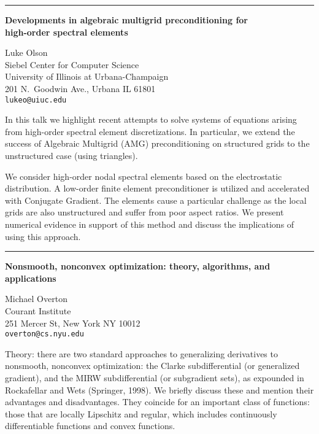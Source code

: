 \documentclass[twosided]{report}
\begin{document}
	\begin{center} \rule{6in}{1pt} \end{center}

\begin{center}
{\large			%
{\bf Developments in algebraic multigrid preconditioning for \\
	high-order spectral elements}}

	Luke Olson \\
	Siebel Center for Computer Science \\
	University of Illinois at
	Urbana-Champaign \\ 201 N.~Goodwin Ave., Urbana IL 61801 \\
	{\tt lukeo@uiuc.edu}
\end{center}
In this talk we highlight recent attempts to solve systems
of equations arising from high-order spectral element
discretizations. In particular, we extend the success of
Algebraic Multigrid (AMG) preconditioning on structured
grids to the unstructured case (using triangles).

 We
consider high-order nodal spectral elements based on the
electrostatic distribution. A low-order finite element
preconditioner is utilized and accelerated with Conjugate
Gradient. The elements cause a particular challenge as the
local grids are also unstructured and suffer from poor
aspect ratios. We present numerical evidence in support of
this method and discuss the implications of using this
approach.



	\begin{center} \rule{6in}{1pt} \end{center}

\begin{center}
{\large			%
{\bf Nonsmooth, nonconvex optimization: theory, algorithms, and applications}}

	Michael Overton \\
	Courant Institute \\
	251 Mercer St, New York NY 10012 \\
	{\tt overton@cs.nyu.edu}
\end{center}
Theory: there are two standard approaches to generalizing
derivatives to nonsmooth, nonconvex optimization: the Clarke
subdifferential (or generalized gradient), and the MIRW
subdifferential (or subgradient sets), as expounded in
Rockafellar and Wets (Springer, 1998). We briefly discuss
these and mention their advantages and disadvantages. They
coincide for an important class of functions: those that are
locally Lipschitz and regular, which includes continuously
differentiable functions and convex functions.
\end{document}
